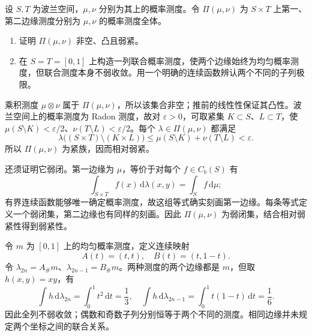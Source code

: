 \begin{optionalexercise}\label{b1:ex:12-joint-marginals}
设 \(S,T\) 为波兰空间，\(\mu,\nu\) 分别为其上的概率测度。令 \(\Pi(\mu,\nu)\) 为 \(S\times T\) 上第一、第二边缘测度分别为 \(\mu,\nu\) 的概率测度全体。
\begin{enumerate}
\item\label{b1:item:12-couplings-compact}
证明 \(\Pi(\mu,\nu)\) 非空、凸且弱紧。
\item\label{b1:item:12-couplings-not-unique}
在 \(S=T=[0,1]\) 上构造一列联合概率测度，使两个边缘始终为均匀概率测度，但联合测度本身不弱收敛。用一个明确的连续函数辨认两个不同的子列极限。
\end{enumerate}
\end{optionalexercise}
\begin{solution}
乘积测度 \(\mu\otimes\nu\) 属于 \(\Pi(\mu,\nu)\)，所以该集合非空；推前的线性性保证其凸性。波兰空间上的概率测度为 Radon 测度，故对 \(\varepsilon>0\)，可取紧集 \(K\subset S\)、\(L\subset T\)，使 \(\mu(S\setminus K)<\varepsilon/2\)、\(\nu(T\setminus L)<\varepsilon/2\)。每个 \(\lambda\in\Pi(\mu,\nu)\) 都满足
\[
 \lambda\bigl((S\times T)\setminus(K\times L)\bigr)
 \le\mu(S\setminus K)+\nu(T\setminus L)<\varepsilon.
\]
所以 \(\Pi(\mu,\nu)\) 为紧族，因而相对弱紧。

还须证明它弱闭。第一边缘为 \(\mu\)，等价于对每个 \(f\in C_b(S)\) 有
\[
 \int_{S\times T}f(x)\,\mathrm d\lambda(x,y)=\int_Sf\,\mathrm d\mu;
\]
有界连续函数能够唯一确定概率测度，故这组等式确实刻画第一边缘。每条等式定义一个弱闭集，第二边缘也有同样的刻画。因此 \(\Pi(\mu,\nu)\) 为弱闭集，结合相对弱紧性得到弱紧性。

令 \(m\) 为 \([0,1]\) 上的均匀概率测度，定义连续映射
\[
 A(t)=(t,t),\quad B(t)=(t,1-t).
\]
令 \(\lambda_{2n}=A_\#m\)、\(\lambda_{2n-1}=B_\#m\)。两种测度的两个边缘都是 \(m\)，但取 \(h(x,y)=xy\)，有
\[
 \int h\,\mathrm d\lambda_{2n}=\int_0^1t^2\,\mathrm dt=\frac13,
 \quad
 \int h\,\mathrm d\lambda_{2n-1}=\int_0^1t(1-t)\,\mathrm dt=\frac16.
\]
因此全列不弱收敛；偶数和奇数子列分别恒等于两个不同的测度。相同边缘并未规定两个坐标之间的联合关系。
\end{solution}
